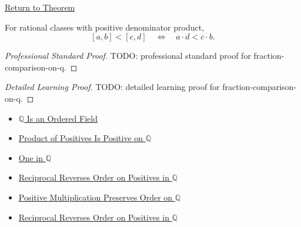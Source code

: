 \newpage
{}
\label{prf:fraction-comparison-on-q}

\begin{remark*}[Return]
\hyperref[cor:fraction-comparison-on-q]{Return to Theorem}
\end{remark*}

\begin{corollary*}
For rational classes with positive denominator product,
\[
[a,b]<[c,d]
\quad\Longleftrightarrow\quad
a\cdot d<c\cdot b.
\]
\end{corollary*}

\begin{proof}[Professional Standard Proof]
\LRAProofBodyStart
TODO: professional standard proof for fraction-comparison-on-q.
\end{proof}

\begin{proof}[Detailed Learning Proof]
\LRAProofBodyStart
TODO: detailed learning proof for fraction-comparison-on-q.
\end{proof}

\begin{remark*}
\end{remark*}

\begin{dependencies}
\begin{itemize}
  \item \hyperref[thm:q-is-an-ordered-field]{$\mathbb{Q}$ Is an Ordered Field}
  \item \hyperref[prop:product-of-positives-is-positive-q]{Product of Positives Is Positive on $\mathbb{Q}$}
  \item \hyperref[def:one-in-q]{One in $\mathbb{Q}$}
  \item \hyperref[thm:reciprocal-reverses-order-on-positives-q]{Reciprocal Reverses Order on Positives in $\mathbb{Q}$}
  \item \hyperref[thm:positive-multiplication-preserves-order-on-q]{Positive Multiplication Preserves Order on $\mathbb{Q}$}
  \item \hyperref[thm:reciprocal-reverses-order-on-positives-q]{Reciprocal Reverses Order on Positives in $\mathbb{Q}$}
\end{itemize}
\end{dependencies}

\clearpage
